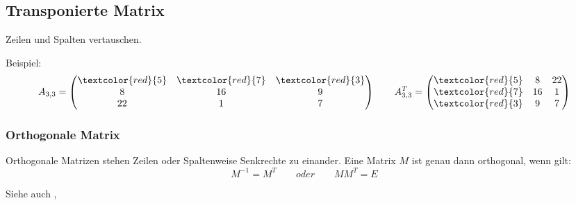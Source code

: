 \subsection{Transponierte Matrix}\label{transposematrix}
Zeilen und Spalten vertauschen.

Beispiel:
\[
	A_{3,3} = \begin{pmatrix}
		\textcolor{red}{5} & \textcolor{red}{7} & \textcolor{red}{3} \\
		8 & 16 & 9 \\
		22 & 1 & 7 \\
	\end{pmatrix}
	\qquad
	A^{T}_{3,3} = \begin{pmatrix}
		\textcolor{red}{5} & 8 & 22 \\
		\textcolor{red}{7} & 16 & 1 \\
		\textcolor{red}{3} & 9 & 7 \\
	\end{pmatrix}
\]

\subsubsection{Orthogonale Matrix}\label{orthogonalmatrix}
Orthogonale Matrizen stehen Zeilen oder Spaltenweise Senkrechte zu einander. Eine Matrix $M$ ist genau dann orthogonal, wenn gilt: \[M^{-1} = M^T \qquad oder \qquad MM^T = E\]

\noindent Siehe auch , 

